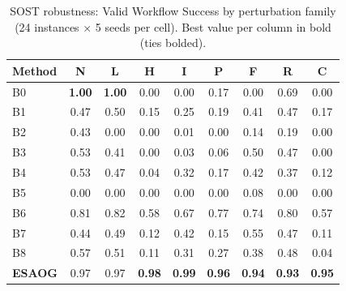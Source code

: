 \begin{table}[H]
\centering
\caption{SOST robustness: Valid Workflow Success by perturbation family (24 instances $\times$ 5 seeds per cell). Best value per column in bold (ties bolded).}
\label{tab:sostresults}
\scriptsize
\begin{tabular}{lcccccccc}
\toprule
Method & N & L & H & I & P & F & R & C\\
\midrule
B0 & \textbf{1.00} & \textbf{1.00} & 0.00 & 0.00 & 0.17 & 0.00 & 0.69 & 0.00\\
B1 & 0.47 & 0.50 & 0.15 & 0.25 & 0.19 & 0.41 & 0.47 & 0.17\\
B2 & 0.43 & 0.00 & 0.00 & 0.01 & 0.00 & 0.14 & 0.19 & 0.00\\
B3 & 0.53 & 0.41 & 0.00 & 0.03 & 0.06 & 0.50 & 0.47 & 0.00\\
B4 & 0.53 & 0.47 & 0.04 & 0.32 & 0.17 & 0.42 & 0.37 & 0.12\\
B5 & 0.00 & 0.00 & 0.00 & 0.00 & 0.00 & 0.08 & 0.00 & 0.00\\
B6 & 0.81 & 0.82 & 0.58 & 0.67 & 0.77 & 0.74 & 0.80 & 0.57\\
B7 & 0.44 & 0.49 & 0.12 & 0.42 & 0.15 & 0.55 & 0.47 & 0.11\\
B8 & 0.57 & 0.51 & 0.11 & 0.31 & 0.27 & 0.38 & 0.48 & 0.04\\
\textbf{ESAOG} & 0.97 & 0.97 & \textbf{0.98} & \textbf{0.99} & \textbf{0.96} & \textbf{0.94} & \textbf{0.93} & \textbf{0.95}\\
\bottomrule
\end{tabular}
\end{table}
